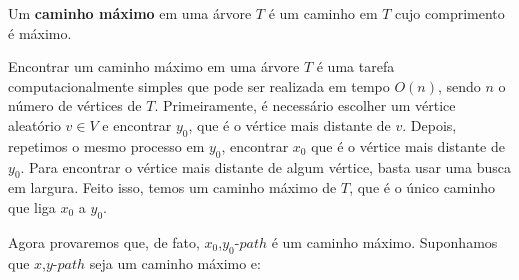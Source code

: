 \documentclass[a4paper,12pt]{article}
\begin{document}
    	

    	Um \textbf{caminho máximo} em uma árvore $T$ é
    	um caminho em $T$ cujo comprimento é máximo.

    	Encontrar um caminho máximo em uma árvore $T$ é uma tarefa
    	computacionalmente simples que pode ser realizada em tempo 
    	$O(n)$, sendo $n$ o número de vértices de $T$. 
    	Primeiramente, é necessário escolher um vértice aleatório 
    	$v \in V$ e encontrar $y_0$,
    	que é o vértice mais distante de $v$.
    	Depois, repetimos o mesmo processo em $y_0$, encontrar
    	$x_0$ que é o vértice mais distante de $y_0$. 
    	Para encontrar o vértice mais distante de algum vértice, 
    	basta usar uma busca em largura.  
    	Feito isso, temos um caminho máximo de $T$, que é o único
    	caminho que liga $x_0$ a $y_0$.


    	Agora provaremos que, de fato, $x_0$,$y_0$-$path$ é um
    	caminho máximo.
    	Suponhamos que $x$,$y$-$path$ seja um caminho máximo e:
\end{document}
